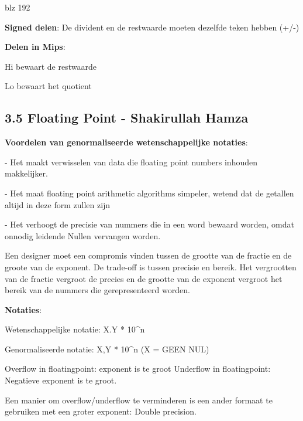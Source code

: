 blz 192

\textbf{Signed delen}:
De divident en de restwaarde moeten dezelfde teken hebben (+/-)

\textbf{Delen in Mips}:

Hi bewaart de restwaarde

Lo bewaart het quotient


\subsection{3.5 Floating Point - Shakirullah Hamza}							%
\begin{figure}
\end{figure}


\textbf{Voordelen van genormaliseerde wetenschappelijke notaties}:

- Het maakt verwisselen van data die floating point numbers inhouden makkelijker.

- Het maat floating point arithmetic algorithms simpeler, wetend dat de getallen altijd in deze form zullen zijn

- Het verhoogt de precisie van nummers die in een word bewaard worden, omdat onnodig leidende Nullen vervangen worden.

Een designer moet een compromis vinden tussen de grootte van de fractie en de groote van de exponent. De trade-off is tussen precisie en bereik. Het vergrootten van de fractie vergroot de precies en de grootte van de exponent vergroot het bereik van de nummers die gerepresenteerd worden.

\textbf{Notaties}:

Wetenschappelijke notatie: X.Y * 10^n

Genormaliseerde notatie: X,Y * 10^n (X = GEEN NUL)

Overflow in floatingpoint: exponent is te groot
Underflow in floatingpoint: Negatieve exponent is te groot.

Een manier om overflow/underflow te verminderen is een ander formaat te gebruiken met een groter exponent: Double precision.

